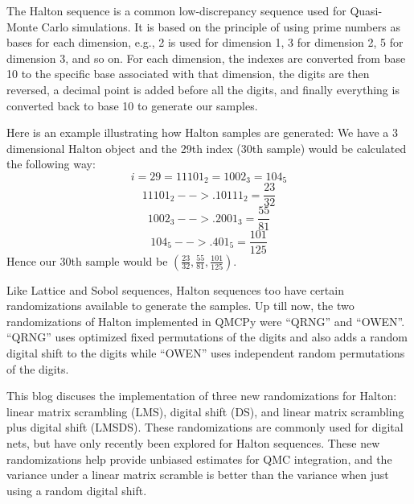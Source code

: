 \setcounter{lstlisting}{0}
\setlength{\parindent}{0pt}
\setlength{\parskip}{\baselineskip}

The Halton sequence is a common low-discrepancy sequence used for Quasi-Monte Carlo simulations. It is based on the principle of using prime numbers as bases for each dimension, e.g., 2 is used for dimension 1, 3 for dimension 2, 5 for dimension 3, and so on. For each dimension, the indexes are converted from base 10 to the specific base associated with that dimension, the digits are then reversed, a decimal point is added before all the digits, and finally everything is converted back to base 10 to generate our samples.

Here is an example illustrating how Halton samples are generated:  We have a 3 dimensional Halton object and the 29th index (30th sample) would be calculated the following way:
\begin{equation}
    i = 29 = 11101_2 = 1002_3 = 104_5 \nonumber 
    \end{equation}
\begin{equation}
    11101_2 --> .10111_2 = \frac{23}{32} \nonumber
    \end{equation}
\begin{equation}
    1002_3 --> .2001_3 = \frac{55}{81}   \nonumber
    \end{equation}
\begin{equation}
    104_5 --> .401_5 = \frac{101}{125}   \nonumber
    \end{equation}
Hence our 30th sample would be \( \left( \frac{23}{32}, \frac{55}{81}, \frac{101}{125} \right) \).

Like Lattice and Sobol sequences, Halton sequences too have certain randomizations available to generate the samples. Up till now, the two randomizations of Halton implemented in QMCPy were ``QRNG''\cite{mhcl2019qrng} and ``OWEN''\cite{owen2017randomized}. ``QRNG'' uses optimized fixed permutations of the digits and also adds a random digital shift to the digits while ``OWEN'' uses independent random permutations of the digits. 

This blog discuses the implementation of three new randomizations for Halton: linear matrix scrambling (LMS), digital shift (DS), and linear matrix scrambling plus digital shift (LMS\textunderscore DS).  These randomizations are commonly used for digital nets, but have only recently been explored for Halton sequences.
These new randomizations help provide unbiased estimates for QMC integration, and the variance under a linear matrix scramble is better than the variance when just using a random digital shift.  

